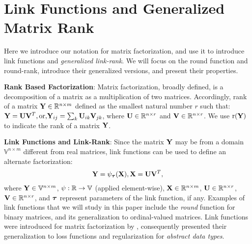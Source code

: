 \documentclass{article}
\newcommand{\sameer}[1]{\todo[color=blue!20]{\textbf{s:} #1}{}}
\newcommand{\pouya}[1]{\todo[color=green!20]{\textbf{p:} #1}{}}
\newcommand{\para}[1]{\vspace{2mm}\noindent\textbf{#1}:}
\begin{document}
\section{Link Functions and Generalized Matrix Rank}
\label{sec:link}

Here we introduce our notation for matrix factorization, and use it to introduce link functions and \emph{generalized link-rank}.
We will focus on the round function and round-rank, introduce their generalized versions, and present their properties.


\para{Rank Based Factorization}
Matrix factorization, broadly defined, is a decomposition of a matrix as a multiplication of two matrices. 
Accordingly, rank of a matrix $\mathbf{Y}\in {\mathbb{R}}^{n\times m}$ defined as the smallest natural number $r$ such that:
$
\mathbf{Y} = \mathbf{U} \mathbf{V}^T, \text{or,}
\mathbf{Y}_{ij} = \sum_k \mathbf{U}_{ik}\mathbf{V}_{jk}
$, %
where $\mathbf{U}\in {\mathbb{R}}^{n\times r}$ and $\mathbf{V}\in {\mathbb{R}}^{n\times r}$. 
We use $\mathrm{r}(\mathbf{Y})$ to indicate the rank of a matrix $\mathbf{Y}$. 

\para{Link Functions and Link-Rank}
Since the matrix $\mathbf{Y}$ may be from a domain $\mathbb{V}^{n\times m}$ different from real matrices, link functions can be used to define an alternate factorization: %
\begin{align}
\mathbf{Y} = \psi_{\boldsymbol{\tau}}(\mathbf{X}), 
\mathbf{X} = \mathbf{U} \mathbf{V}^T,
\end{align}
where $\mathbf{Y} \in \mathbb{V}^{n\times m}$, $\psi:{\mathbb{R}}\rightarrow\mathbb{V}$ (applied element-wise), $\mathbf{X}\in {\mathbb{R}}^{n\times m}$, $\mathbf{U}\in {\mathbb{R}}^{n\times r}$, $\mathbf{V}\in {\mathbb{R}}^{n\times r}$, and ${\boldsymbol{\tau}}$ represent parameters of the link function, if any. %
Examples of link functions that we will study in this paper include the \emph{round} function for binary matrices, and its generalization to ordinal-valued matrices.
Link functions were introduced for matrix factorization by \citet{singh08:a-unified}, consequently \citet{udell14:generalized} presented their generalization to loss functions and regularization for \emph{abstract data types}.
\end{document}
